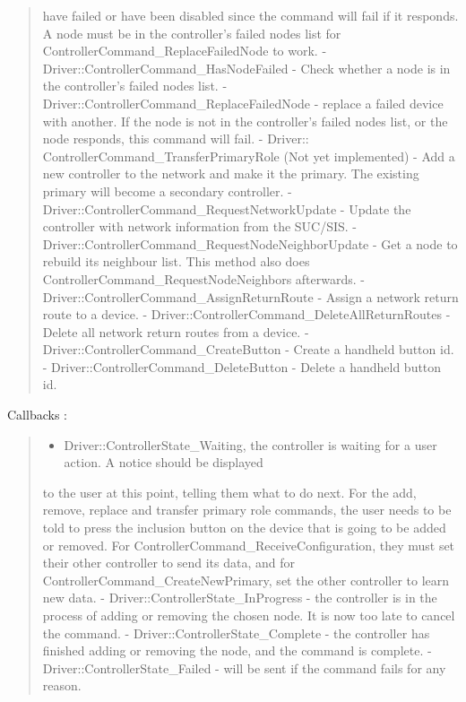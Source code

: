 \documentclass[letterpaper,10pt,english]{sphinxmanual}
\begin{document}
\begin{fulllineitems}
\begin{quote}
have failed or have been disabled since the command will fail if it responds.  A node must be in the controller's failed nodes list
for ControllerCommand\_ReplaceFailedNode to work.
- Driver::ControllerCommand\_HasNodeFailed - Check whether a node is in the controller's failed nodes list.
- Driver::ControllerCommand\_ReplaceFailedNode - replace a failed device with another. If the node is not in
the controller's failed nodes list, or the node responds, this command will fail.
- Driver:: ControllerCommand\_TransferPrimaryRole    (Not yet implemented) - Add a new controller to the network and
make it the primary.  The existing primary will become a secondary controller.
- Driver::ControllerCommand\_RequestNetworkUpdate - Update the controller with network information from the SUC/SIS.
- Driver::ControllerCommand\_RequestNodeNeighborUpdate - Get a node to rebuild its neighbour list.  This method also does ControllerCommand\_RequestNodeNeighbors afterwards.
- Driver::ControllerCommand\_AssignReturnRoute - Assign a network return route to a device.
- Driver::ControllerCommand\_DeleteAllReturnRoutes - Delete all network return routes from a device.
- Driver::ControllerCommand\_CreateButton - Create a handheld button id.
- Driver::ControllerCommand\_DeleteButton - Delete a handheld button id.
\end{quote}

Callbacks :
\begin{quote}
\begin{itemize}
\item {} 
Driver::ControllerState\_Waiting, the controller is waiting for a user action.  A notice should be displayed

\end{itemize}

to the user at this point, telling them what to do next.
For the add, remove, replace and transfer primary role commands, the user needs to be told to press the
inclusion button on the device that  is going to be added or removed.  For ControllerCommand\_ReceiveConfiguration,
they must set their other controller to send its data, and for ControllerCommand\_CreateNewPrimary, set the other
controller to learn new data.
- Driver::ControllerState\_InProgress - the controller is in the process of adding or removing the chosen node.  It is now too late to cancel the command.
- Driver::ControllerState\_Complete - the controller has finished adding or removing the node, and the command is complete.
- Driver::ControllerState\_Failed - will be sent if the command fails for any reason.
\end{quote}


\end{fulllineitems}
\end{document}
